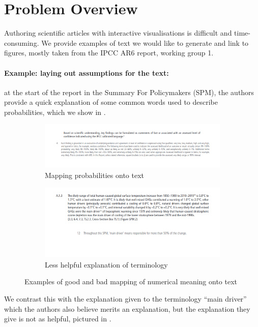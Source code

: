 \section{Problem Overview}
Authoring scientific articles with interactive visualisations is difficult
and time-consuming. We provide examples of text we would like to generate
and link to figures, mostly taken from the IPCC AR6 report, working group 1.

\paragraph*{Example: laying out assumptions for the text:} at the start of
the report in the Summary For Policymakers (SPM), the authors provide a
quick explanation of some common words used to describe probabilities,
which we show in .
\begin{figure}
   \begin{subfigure}{0.49\textwidth}
      \includegraphics[width=\textwidth]{fig/ipcc-probabilities}
      \caption{Mapping probabilities onto text}
      \label{fig:good-text-mapping}
   \end{subfigure}
   \begin{subfigure}{0.49\textwidth}
      \includegraphics[width=\textwidth]{fig/ipcc-text-def-bad}
      \caption{Less helpful explanation of terminology}
      \label{fig:bad-text-mapping}
   \end{subfigure}
   \caption{Examples of good and bad mapping of numerical meaning onto text}
   \label{fig:text-mapping}
\end{figure}
We contrast this with the explanation given to the terminology ``main driver''
which the authors also believe merits an explanation, but the explanation they
give is not as helpful, pictured in .

